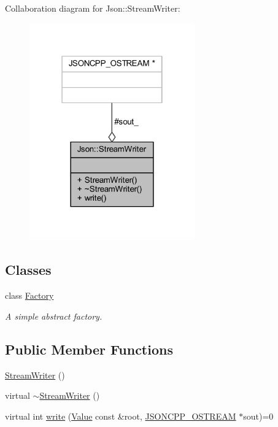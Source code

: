 Collaboration diagram for Json\+:\+:Stream\+Writer\+:\nopagebreak
\begin{figure}[H]
\begin{center}
\leavevmode
\includegraphics[width=202pt]{class_json_1_1_stream_writer__coll__graph}
\end{center}
\end{figure}
\subsection*{Classes}
\begin{DoxyCompactItemize}
\item 
class \hyperlink{class_json_1_1_stream_writer_1_1_factory}{Factory}
\begin{DoxyCompactList}\small\item\em A simple abstract factory. \end{DoxyCompactList}\end{DoxyCompactItemize}
\subsection*{Public Member Functions}
\begin{DoxyCompactItemize}
\item 
\hyperlink{class_json_1_1_stream_writer_a66e6f5113618ce6b04cac9b3c85a3707}{Stream\+Writer} ()
\item 
virtual \hyperlink{class_json_1_1_stream_writer_a03f8fb6a873b6b50f05bc4556e043c3a}{$\sim$\+Stream\+Writer} ()
\item 
virtual int \hyperlink{class_json_1_1_stream_writer_a84278bad0c9a9fc587bc2a97c5bb5993}{write} (\hyperlink{class_json_1_1_value}{Value} const \&root, \hyperlink{json_8h_a37a25be5fca174927780caeb280094ce}{J\+S\+O\+N\+C\+P\+P\+\_\+\+O\+S\+T\+R\+E\+AM} $\ast$sout)=0
\end{DoxyCompactItemize}
